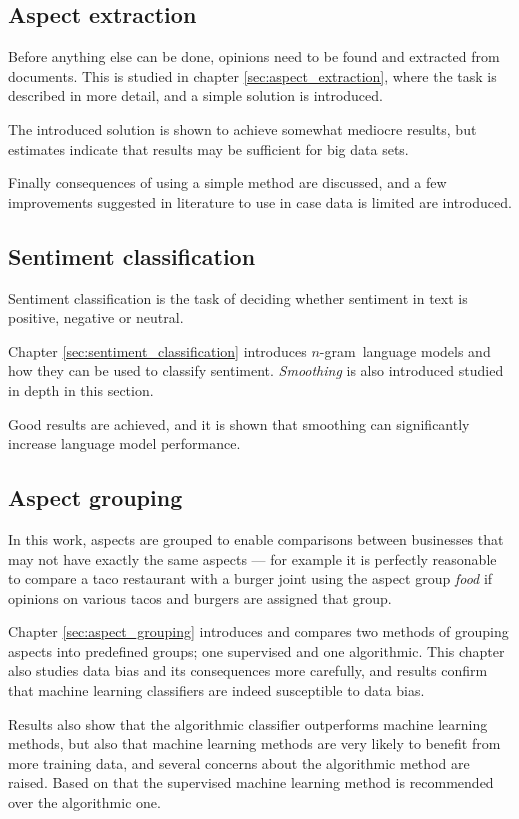 \documentclass[a4paper,11pt]{kth-mag}
\newcommand{\ngram}{$n$-gram}
\begin{document}
\subsection{Aspect extraction}
Before anything else can be done, opinions need to be found and extracted from documents.
This is studied in chapter \ref{sec:aspect_extraction}, where the task is described in more detail,
and a simple solution is introduced.

The introduced solution is shown to achieve somewhat mediocre results, but estimates indicate
that results may be sufficient for big data sets.

Finally consequences of using a simple method are discussed, and a few improvements suggested in literature
to use in case data is limited are introduced.


\subsection{Sentiment classification}
Sentiment classification is the task of deciding whether sentiment in text is positive, negative or neutral.

Chapter \ref{sec:sentiment_classification} introduces \ngram~language models and how they can be used
to classify sentiment. \emph{Smoothing} is also introduced studied in depth in this section.

Good results are achieved, and it is shown that smoothing can significantly increase language
model performance.

\subsection{Aspect grouping}
In this work, aspects are grouped to enable comparisons between businesses that may not have exactly the same aspects ---
for example it is perfectly reasonable to compare a taco restaurant with a burger joint using the aspect group \emph{food}
if opinions on various tacos and burgers are assigned that group.

Chapter \ref{sec:aspect_grouping} introduces and compares two methods of grouping aspects into predefined groups;
one supervised and one algorithmic. This chapter also studies data bias and its consequences more carefully,
and results confirm that machine learning classifiers are indeed susceptible to data bias.

Results also show that the algorithmic classifier outperforms machine learning methods,
but also that machine learning methods are very likely to benefit from more training data,
and several concerns about the algorithmic method are raised.
Based on that the supervised machine learning method is recommended over the algorithmic one.
\end{document}
